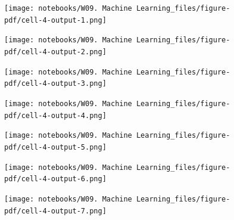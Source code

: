 \documentclass[
  letterpaper,
  DIV=11,
  numbers=noendperiod]{scrreprt}
\begin{document}
\begin{figure}[H]

{\centering \texttt{[image: notebooks/W09. Machine Learning\_files/figure-pdf/cell-4-output-1.png]}

}

\end{figure}

\begin{figure}[H]

{\centering \texttt{[image: notebooks/W09. Machine Learning\_files/figure-pdf/cell-4-output-2.png]}

}

\end{figure}

\begin{figure}[H]

{\centering \texttt{[image: notebooks/W09. Machine Learning\_files/figure-pdf/cell-4-output-3.png]}

}

\end{figure}

\begin{figure}[H]

{\centering \texttt{[image: notebooks/W09. Machine Learning\_files/figure-pdf/cell-4-output-4.png]}

}

\end{figure}

\begin{figure}[H]

{\centering \texttt{[image: notebooks/W09. Machine Learning\_files/figure-pdf/cell-4-output-5.png]}

}

\end{figure}

\begin{figure}[H]

{\centering \texttt{[image: notebooks/W09. Machine Learning\_files/figure-pdf/cell-4-output-6.png]}

}

\end{figure}

\begin{figure}[H]

{\centering \texttt{[image: notebooks/W09. Machine Learning\_files/figure-pdf/cell-4-output-7.png]}

}

\end{figure}
\end{document}
